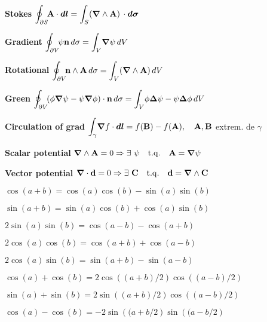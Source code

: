 \item \textbf{Stokes} \quad
$\displaystyle{\oint_{\partial S}} \! \vec{\rm{A}} \cdot \vec{dl} = \displaystyle{\int_S} (\vec{\nabla} \wedge \vec{\rm{A}}) \, \cdot \vec{d\sigma}$
 
\item \textbf{Gradient} \quad
$\displaystyle{\oint_{\partial V}} \! \psi\vec{\rm{n}} \, d\sigma = \displaystyle{\int_V} \vec{\nabla}\psi \, dV$
 
\item \textbf{Rotational} \quad
$\displaystyle{\oint_{\partial V}} \! \vec{\rm{n}} \wedge \vec{\rm{A}} \, d\sigma = \displaystyle{\int_V} (\vec{\nabla} \wedge \vec{\rm{A}}) \, dV$
 
\item \textbf{Green} \quad
$\displaystyle{\oint_{\partial V}} \! (\phi\vec{\nabla}\psi - \psi\vec{\nabla}\phi)\cdot\vec{\rm{n}} \, d\sigma = \displaystyle{\int_V} \phi\vec{\Delta}\psi - \psi\vec{\Delta}\phi \, dV$
 
\item \textbf{Circulation of grad} \quad
$\displaystyle{\int_{\gamma}} \vec{\nabla}f\cdot\vec{dl} = f(\vec{\rm B}) - f(\vec{\rm A}), \quad \vec{\rm{A}}, \vec{\rm{B}}$ extrem. de $\gamma$ 
 
\item \textbf{Scalar potential} \quad
$\vec{\nabla} \wedge \vec{\rm{A}} = 0 \Rightarrow \exists \ \psi \quad \mathrm{t.q.} \quad \vec{\rm{A}} = \vec{\nabla}\psi$
 
\item \textbf{Vector potential} \quad
$\vec{\nabla}\cdot\vec{\rm{d} } = 0 \Rightarrow \exists \ \vec{\rm{C}} \quad \mathrm{t.q.} \quad \vec{\rm{d} } = \vec{\nabla} \wedge \vec{\rm C}$
\squishend 

\squishlist 
\item $\cos(a+b) = \cos(a)\cos(b)-\sin(a)\sin(b)$
\item $\sin(a+b) = \sin(a)\cos(b) + \cos(a)\sin(b)$
\item $2\sin(a)\sin(b) = \cos(a-b) - \cos(a+b)$ 
\item $2\cos(a)\cos(b) = \cos(a+b) + \cos(a-b)$ 
\item $2\cos(a)\sin(b) = \sin(a+b) - \sin(a-b)$ 
\item $\cos(a) + \cos(b) = 2\cos\left((a+b)/2\right)\cos\left((a-b)/2\right)$ 
\item $\sin(a) + \sin(b) = 2\sin\left((a+b)/2\right)\cos\left((a-b)/2\right)$ 
\item $\cos(a) - \cos(b) = -2\sin\left((a+b/2\right)\sin\left((a-b/2\right)$ 

